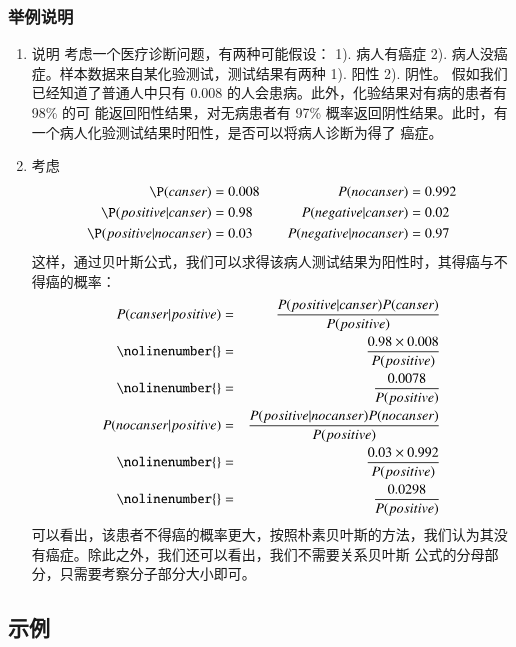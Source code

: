 \documentclass[11pt]{ctexart}
\begin{document}
\subsubsection{举例说明}
\label{sec:orgheadline37}
\begin{enumerate}
\item 说明
\label{sec:orgheadline35}
考虑一个医疗诊断问题，有两种可能假设： 1). 病人有癌症 2). 病人没癌症。样本数据来自某化验测试，测试结果有两种
1). 阳性 2). 阴性。 假如我们已经知道了普通人中只有 0.008 的人会患病。此外，化验结果对有病的患者有 98\% 的可
能返回阳性结果，对无病患者有 97\% 概率返回阴性结果。此时，有一个病人化验测试结果时阳性，是否可以将病人诊断为得了
癌症。
\item 考虑
\label{sec:orgheadline36}
\begin{alignat}{2}
 \P(canser) &= 0.008  &\quad P(no canser) &= 0.992 \\  
 \P(positive|canser) &= 0.98  &\quad P(negative|canser) &= 0.02 \\  
 \P(positive|no canser) &= 0.03  &\quad P(negative|no canser) &= 0.97  
\end{alignat}
这样，通过贝叶斯公式，我们可以求得该病人测试结果为阳性时，其得癌与不得癌的概率：
\begin{eqnarray}
  P(canser|positive) &=& \frac{P(positive|canser)P(canser)}{P(positive)}\\\nolinenumber
  {} & = & \frac{0.98\times{}0.008}{P(positive)}\\\nolinenumber
  {} & = & \frac{0.0078}{P(positive)}\\
  P(no canser|positive) & = & \frac{P(positive|no canser)P(no canser)}{P(positive)}\\\nolinenumber
  {} & = & \frac{0.03\times{}0.992}{P(positive)}\\\nolinenumber
  {} & = & \frac{0.0298}{P(positive)}
\end{eqnarray}
可以看出，该患者不得癌的概率更大，按照朴素贝叶斯的方法，我们认为其没有癌症。除此之外，我们还可以看出，我们不需要关系贝叶斯
公式的分母部分，只需要考察分子部分大小即可。
\end{enumerate}
\subsection{示例}
\label{sec:orgheadline45}
\end{document}
